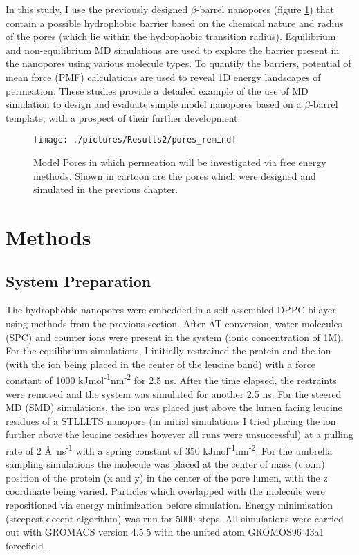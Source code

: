 In this study, I use the previously designed $\beta$-barrel nanopores (figure \ref{fig:pores_remind}) that contain a possible hydrophobic barrier based on the chemical nature and radius of the pores (which lie within the hydrophobic transition radius). Equilibrium and non-equilibrium MD simulations are used to explore the barrier present in the nanopores using various molecule types. To quantify the barriers, potential of mean force (PMF) calculations are used to reveal 1D energy landscapes of permeation. These studies provide a detailed example of the use of MD simulation to design and evaluate simple model nanopores based on a $\beta$-barrel template, with a prospect of their further development. 

\begin{figure}[H]
\begin{center}
\texttt{[image: ./pictures/Results2/pores\_remind]}
\caption[Model Pores in which permeation will be investigated.] {Model Pores in which permeation will be investigated via free energy methods. Shown in cartoon are the pores which were designed and simulated in the previous chapter.} %
\label{fig:pores_remind}
\end{center}
\end{figure}


\section{Methods}

\subsection{System Preparation}
The hydrophobic nanopores were embedded in a self assembled DPPC bilayer using methods from the previous section. After AT conversion, water molecules (SPC) and counter ions were present in the system (ionic concentration of 1M). For the equilibrium simulations, I initially restrained the protein and the ion (with the ion being placed in the center of the leucine band) with a force constant of 1000 kJmol\textsuperscript{-1}nm\textsuperscript{-2} for 2.5 ns. After the time elapsed, the restraints were removed and the system was simulated for another 2.5 ns. For the steered MD (SMD) simulations, the ion was placed just above the lumen facing leucine residues of a STLLLTS nanopore (in initial simulations I tried placing the ion further above the leucine residues however all runs were unsuccessful) at a pulling rate of 2 \AA\ ns\textsuperscript{-1} with a spring constant of 350 kJmol\textsuperscript{-1}nm\textsuperscript{-2}. For the umbrella sampling simulations the molecule was placed at the center of mass (c.o.m) position of the protein (x and y) in the center of the pore lumen, with the z coordinate being varied. Particles which overlapped with the molecule were repositioned via energy minimization before simulation. Energy minimisation (steepest decent algorithm) was run for 5000 steps. All simulations were carried out with GROMACS version 4.5.5 \cite{Berendsen1995,Hess2008} with the united atom GROMOS96 43a1 forcefield \cite{Scott1999,Schuler2001}.


